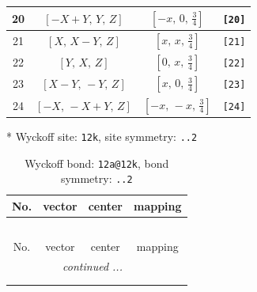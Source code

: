 \documentclass[fleqn,8pt]{jsarticle}
\begin{document}
\begin{longtable}{cccc}
20 & $\left[ - X + Y,\, Y,\, Z \right]$ & $\left[ - x,\, 0,\, \frac{3}{4} \right]$ & {\tt [20]} \\ \hline
21 & $\left[ X,\, X - Y,\, Z \right]$ & $\left[ x,\, x,\, \frac{3}{4} \right]$ & {\tt [21]} \\ \hline
22 & $\left[ Y,\, X,\, Z \right]$ & $\left[ 0,\, x,\, \frac{3}{4} \right]$ & {\tt [22]} \\ \hline
23 & $\left[ X - Y,\, - Y,\, Z \right]$ & $\left[ x,\, 0,\, \frac{3}{4} \right]$ & {\tt [23]} \\ \hline
24 & $\left[ - X,\, - X + Y,\, Z \right]$ & $\left[ - x,\, - x,\, \frac{3}{4} \right]$ & {\tt [24]} \\
\end{longtable}
* Wyckoff site: {\tt 12k}, site symmetry: {\tt ..2}
\renewcommand{\arraystretch}{1.2}
\begin{longtable}{cccc}
\caption{Wyckoff bond: {\tt 12a@12k}, bond symmetry: {\tt ..2}}
 \\
 \hline \hline
No. & vector & center & mapping \\ \hline \endfirsthead

\multicolumn{3}{l}{\tablename\ \thetable{}} \\
 \hline \hline
No. & vector & center & mapping \\ \hline \endhead

 \hline \hline
\multicolumn{3}{r}{\footnotesize\it continued ...} \\ \endfoot

 \hline \hline
\multicolumn{3}{r}{} \\ \endlastfoot


\end{longtable}
\end{document}
